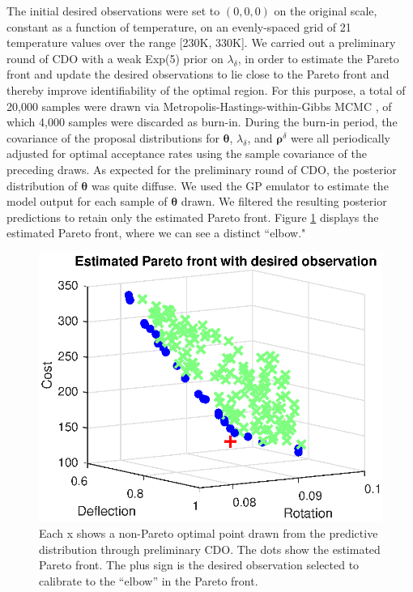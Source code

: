 \documentclass[12pt]{article}
\begin{document}
The initial desired observations were set to $(0,0,0)$ on the original scale, constant as a function of temperature, on an evenly-spaced grid of 21 temperature values over the range [230K, 330K].
%
We carried out a preliminary round of CDO with a weak Exp(5) prior on $\lambda_\delta$, in order to estimate the Pareto front and update the desired observations to lie close to the Pareto front and thereby improve identifiability of the optimal region.
%
For this purpose, a total of 20,000 samples were drawn via Metropolis-Hastings-within-Gibbs MCMC \citep{Metropolis1953, Hastings1970, Geman1984}, of which 4,000 samples were discarded as burn-in. 
%
During the burn-in period, the covariance of the proposal distributions for $\boldsymbol \theta$, $\lambda_\delta$, and $\boldsymbol\rho^\delta$ were all periodically adjusted for optimal acceptance rates using the sample covariance of the preceding draws.
%
%
%
As expected for the preliminary round of CDO, the posterior distribution of $\boldsymbol\theta$ was quite diffuse.
%
We used the GP emulator to estimate the model output for each sample of $\boldsymbol \theta$ drawn.
%
We filtered the resulting posterior predictions to retain only the estimated Pareto front.
%
Figure \ref{fig:elbow} displays the estimated Pareto front, where we can see a distinct ``elbow."
%
\begin{figure}
\centering
\includegraphics[scale=0.8]{FIG_est_PF_with_des_obs.eps}
\caption{Each x shows a non-Pareto optimal point drawn from the predictive distribution through preliminary CDO. The dots show the estimated Pareto front. The plus sign is the desired observation selected to calibrate to the ``elbow'' in the Pareto front.}
\label{fig:elbow}
\end{figure}
\end{document}
